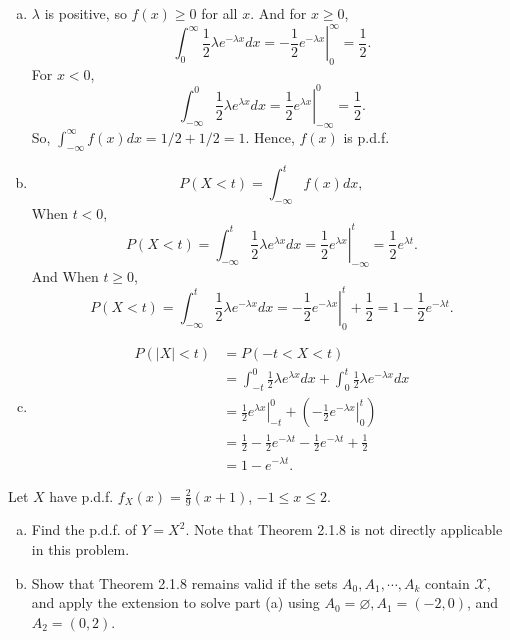 \documentclass[14pt]{elegantbook}
\begin{document}
    \begin{solution}
        \begin{enumerate}[(a)]
            \item $\lambda$ is positive, so $f(x)\geq 0$ for all $x$. And for $x\geq 0$, 
            \[\int_{0}^\infty\frac{1}{2}\lambda e^{-\lambda x} dx=\left.-\frac{1}{2}e^{-\lambda x}\right|_0^\infty=\frac{1}{2}. \]
            For $x< 0$, 
            \[\int_{-\infty}^0\frac{1}{2}\lambda e^{\lambda x} dx=\left.\frac{1}{2}e^{\lambda x}\right|_{-\infty}^0=\frac{1}{2}. \]
            So, $\int_{-\infty}^\infty f(x) dx=1/2+1/2=1$. Hence, $f(x)$ is p.d.f. 
            \item \[P(X<t)=\int_{-\infty}^t f(x) dx, \]
            When $t<0$, 
            \[
                P(X<t)=\int_{-\infty}^t \frac{1}{2}\lambda e^{\lambda x} dx = \left.\frac{1}{2}e^{\lambda x}\right|_{-\infty}^t=\frac{1}{2}e^{\lambda t}.
            \]
            And When $t\geq 0$, 
            \[
                P(X<t)=\int_{-\infty}^t \frac{1}{2}\lambda e^{-\lambda x} dx = \left.-\frac{1}{2}e^{-\lambda x}\right|_{0}^t+\frac{1}{2}=1-\frac{1}{2}e^{-\lambda t}.
            \]
            \item \begin{align*}
                P(|X|<t)&=P(-t<X<t)\\
                &=\int_{-t}^0\frac{1}{2}\lambda e^{\lambda x} dx+\int_0^t\frac{1}{2}\lambda e^{-\lambda x} dx\\
                &=\left.\frac{1}{2}e^{\lambda x}\right|_{-t}^0+\left(\left.-\frac{1}{2}e^{-\lambda x}\right|_0^t\right)\\
                &=\frac{1}{2}-\frac{1}{2}e^{-\lambda t}-\frac{1}{2}e^{-\lambda t}+\frac{1}{2}\\
                &=1-e^{-\lambda t}.
            \end{align*}
        \end{enumerate}
    \end{solution}

    \setcounter{exer}{6}
    \begin{exercise}
        Let $X$ have p.d.f. $f_X(x)=\frac{2}{9}(x+1)$, $-1\leq x\leq 2$. 
        \begin{enumerate}[(a)]
            \item Find the p.d.f. of $Y=X^2$. Note that Theorem 2.1.8 is not directly applicable in this problem. 
            \item Show that Theorem 2.1.8 remains valid if the sets $A_0, A_1, \cdots, A_k$ contain $\mathcal{X}$, and apply the extension to solve part (a) using $A_0=\varnothing, A_1=(-2,0)$, and $A_2=(0,2)$. 
        \end{enumerate}
    \end{exercise}
\end{document}

